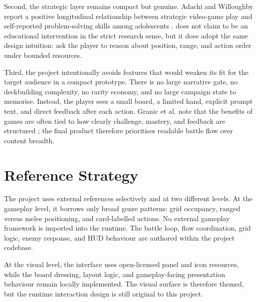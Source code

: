 Second, the strategic layer remains compact but genuine. Adachi and Willoughby report a positive longitudinal relationship between strategic video-game play and self-reported problem-solving skills among adolescents \cite{adachi2013strategicgames}. \projectname{} does not claim to be an educational intervention in the strict research sense, but it does adopt the same design intuition: ask the player to reason about position, range, and action order under bounded resources.

Third, the project intentionally avoids features that would weaken its fit for the target audience in a compact prototype. There is no large narrative gate, no deckbuilding complexity, no rarity economy, and no large campaign state to memorise. Instead, the player sees a small board, a limited hand, explicit prompt text, and direct feedback after each action. Granic et al. note that the benefits of games are often tied to how clearly challenge, mastery, and feedback are structured \cite{granic2014benefits}; the final product therefore prioritises readable battle flow over content breadth.

\section{Reference Strategy}

The project uses external references selectively and at two different levels. At the gameplay level, it borrows only broad genre patterns: grid occupancy, ranged versus melee positioning, and card-labelled actions. No external gameplay framework is imported into the runtime. The battle loop, flow coordination, grid logic, enemy response, and HUD behaviour are authored within the project codebase.

At the visual level, the interface uses open-licensed panel and icon resources, while the board dressing, layout logic, and gameplay-facing presentation behaviour remain locally implemented. The visual surface is therefore themed, but the runtime interaction design is still original to this project.
